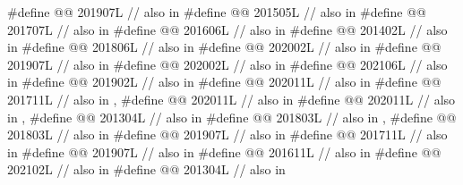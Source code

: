 \begin{codeblock}
#define @@                         201907L // also in 
#define @@                      201505L // also in 
#define @@                 201707L // also in 
#define @@              201606L // also in 
#define @@                201402L // also in 
#define @@                             201806L // also in 
#define @@           202002L // also in 
#define @@                   201907L // also in 
#define @@                              202002L // also in 
#define @@                        202106L // also in 
#define @@                             201902L // also in 
#define @@                        202011L // also in 
#define @@                  201711L // also in , 
#define @@                       202011L // also in 
#define @@                   202011L // also in , 
#define @@                       201304L // also in 
#define @@                       201803L // also in , 
#define @@                           201803L // also in 
#define @@              201907L // also in 
#define @@                        201711L // also in 
#define @@                          201907L // also in 
#define @@                          201611L // also in 
#define @@                     202102L // also in 
#define @@      201304L // also in 

\end{codeblock}
